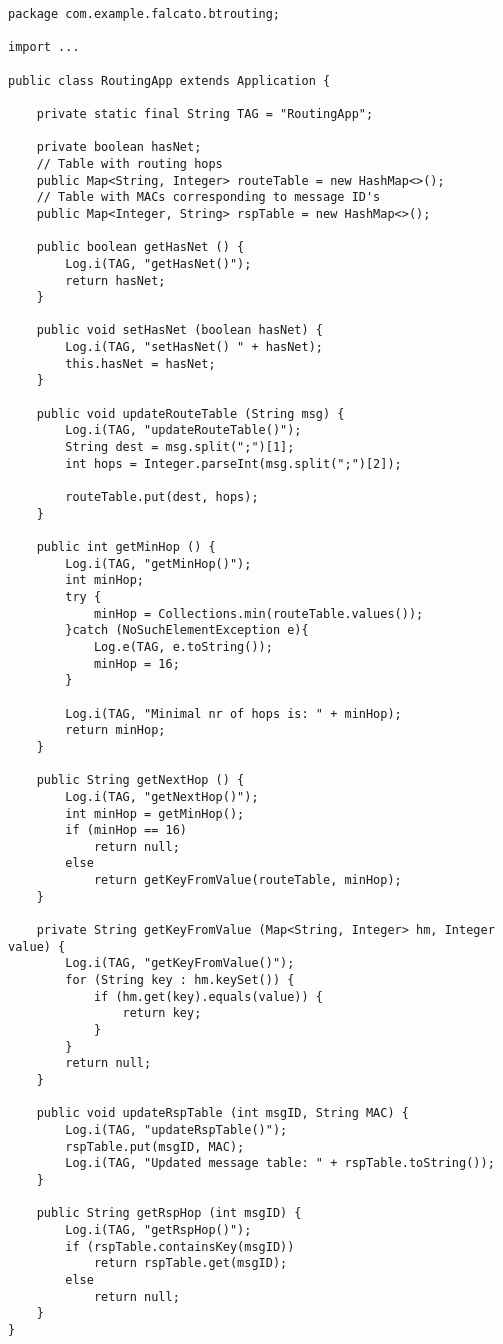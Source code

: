 \begin{verbatim}
package com.example.falcato.btrouting;

import ...

public class RoutingApp extends Application {

    private static final String TAG = "RoutingApp";

    private boolean hasNet;
    // Table with routing hops
    public Map<String, Integer> routeTable = new HashMap<>();
    // Table with MACs corresponding to message ID's
    public Map<Integer, String> rspTable = new HashMap<>();

    public boolean getHasNet () {
        Log.i(TAG, "getHasNet()");
        return hasNet;
    }

    public void setHasNet (boolean hasNet) {
        Log.i(TAG, "setHasNet() " + hasNet);
        this.hasNet = hasNet;
    }

    public void updateRouteTable (String msg) {
        Log.i(TAG, "updateRouteTable()");
        String dest = msg.split(";")[1];
        int hops = Integer.parseInt(msg.split(";")[2]);
        
        routeTable.put(dest, hops);
    }

    public int getMinHop () {
        Log.i(TAG, "getMinHop()");
        int minHop;
        try {
            minHop = Collections.min(routeTable.values());
        }catch (NoSuchElementException e){
            Log.e(TAG, e.toString());
            minHop = 16;
        }

        Log.i(TAG, "Minimal nr of hops is: " + minHop);
        return minHop;
    }

    public String getNextHop () {
        Log.i(TAG, "getNextHop()");
        int minHop = getMinHop();
        if (minHop == 16)
            return null;
        else
            return getKeyFromValue(routeTable, minHop);
    }

    private String getKeyFromValue (Map<String, Integer> hm, Integer value) {
        Log.i(TAG, "getKeyFromValue()");
        for (String key : hm.keySet()) {
            if (hm.get(key).equals(value)) {
                return key;
            }
        }
        return null;
    }

    public void updateRspTable (int msgID, String MAC) {
        Log.i(TAG, "updateRspTable()");
        rspTable.put(msgID, MAC);
        Log.i(TAG, "Updated message table: " + rspTable.toString());
    }

    public String getRspHop (int msgID) {
        Log.i(TAG, "getRspHop()");
        if (rspTable.containsKey(msgID))
            return rspTable.get(msgID);
        else
            return null;
    }
}
\end{verbatim}

